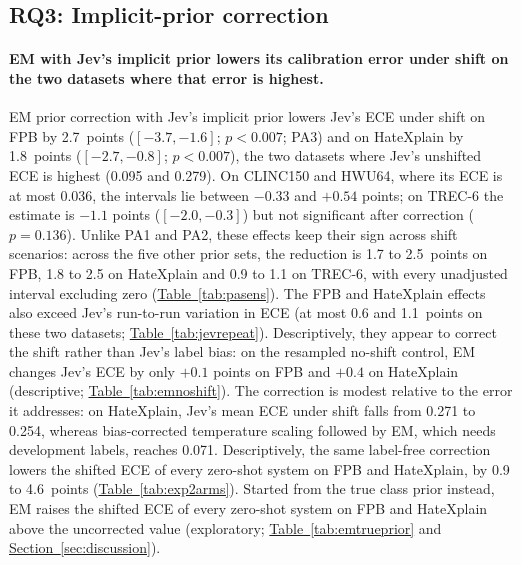 \subsection{RQ3: Implicit-prior correction}
\label{sec:rq3}

\paragraph{EM with Jev's implicit prior lowers its calibration error under shift on the two datasets where that error is
highest.}
EM prior correction with Jev's implicit prior lowers Jev's ECE under shift on FPB by 2.7~points ($[-3.7,-1.6]$;
$p<0.007$; PA3) and on HateXplain by 1.8~points ($[-2.7,-0.8]$; $p<0.007$), the two datasets where Jev's unshifted ECE is
highest (0.095 and 0.279). On CLINC150 and HWU64, where its ECE is at most 0.036, the intervals lie between $-0.33$ and
$+0.54$ points; on TREC-6 the estimate is $-1.1$ points ($[-2.0,-0.3]$) but not significant after correction ($p=0.136$). Unlike PA1
and PA2, these effects keep their sign across shift scenarios: across the five other prior sets, the reduction is 1.7 to 2.5~points on FPB, 1.8 to 2.5 on HateXplain and 0.9 to 1.1 on TREC-6, with every unadjusted interval excluding zero
(\hyperref[tab:pasens]{Table~\ref*{tab:pasens}}). The FPB and HateXplain effects also exceed Jev's run-to-run variation in ECE (at most 0.6 and
1.1~points on these two datasets; \hyperref[tab:jevrepeat]{Table~\ref*{tab:jevrepeat}}). Descriptively, they appear to correct the shift rather
than Jev's label bias: on the resampled no-shift control, EM changes Jev's ECE by only $+0.1$ points on FPB and $+0.4$ on
HateXplain (descriptive; \hyperref[tab:emnoshift]{Table~\ref*{tab:emnoshift}}). The
correction is modest relative to the error it addresses: on HateXplain, Jev's mean ECE under shift falls from 0.271 to
0.254, whereas bias-corrected temperature scaling followed by EM, which needs development labels, reaches 0.071.
Descriptively, the same label-free correction lowers the shifted ECE of every zero-shot system on FPB and HateXplain, by
0.9 to 4.6~points (\hyperref[tab:exp2arms]{Table~\ref*{tab:exp2arms}}). Started from the true class prior
instead, EM raises the shifted ECE of every zero-shot system on FPB and HateXplain above the uncorrected value
(exploratory; \hyperref[tab:emtrueprior]{Table~\ref*{tab:emtrueprior}} and \hyperref[sec:discussion]{Section~\ref*{sec:discussion}}).

